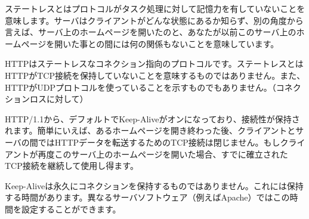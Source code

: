 ステートレスとはプロトコルがタスク処理に対して記憶力を有していないことを意味します。サーバはクライアントがどんな状態にあるか知らず、別の角度から言えば、サーバ上のホームページを開いたのと、あなたが以前このサーバ上のホームページを開いた事との間には何の関係もないことを意味しています。

HTTPはステートレスなコネクション指向のプロトコルです。ステートレスとはHTTPがTCP接続を保持していないことを意味するものではありません。また、HTTPがUDPプロトコルを使っていることを示すものでもありません。（コネクションロスに対して）

HTTP/1.1から、デフォルトでKeep-Aliveがオンになっており、接続性が保持されます。簡単にいえば、あるホームページを開き終わった後、クライアントとサーバの間ではHTTPデータを転送するためのTCP接続は閉じません。もしクライアントが再度このサーバ上のホームページを開いた場合、すでに確立されたTCP接続を継続して使用し得ます。

Keep-Aliveは永久にコネクションを保持するものではありません。これには保持する時間があります。異なるサーバソフトウェア（例えばApache）ではこの時間を設定することができます。
